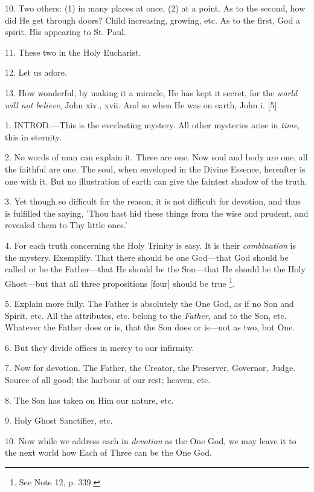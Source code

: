 10. Two others: (1) in many places at once, (2)
at a point. As to the second, how did He get through doors? Child
increasing, growing, etc. As to the first, God a spirit. His appearing
to St. Paul.

11. These two in the Holy Eucharist.

12. Let us adore.

13. How wonderful, by making it a miracle, He has
kept it secret, for the \emph{world will not believe}, John xiv., xvii.
And so when He was on earth, John i. [5].


1. INTROD.—This
is the everlasting mystery. All other mysteries arise in \emph{time},
this in eternity.

2. No words of man can explain it. Three are one.
Now soul and body are one, all the faithful are one. The soul, when
enveloped in the Divine Essence, hereafter is one with it. But no
illustration of earth can give the faintest shadow of the truth.

3. Yet though so difficult for the reason, it is
not difficult for devotion, and thus is fulfilled the saying, 'Thou
hast hid these things from the wise and prudent, and revealed them to
Thy little ones.'

4. For each truth concerning the Holy Trinity is
easy. It is their \emph{combination} is the mystery. Exemplify. That
there should be one God—that God should be called or be the
Father—that He should be the Son—that He should be the Holy
Ghost—but that all three propositions [four] should be true \footnote{See Note
12, p. 339.}.

5. Explain more fully. The Father is absolutely
the One God, as if no Son and Spirit, etc. All the attributes, etc.
belong to the \emph{Father}, and to the Son, etc. Whatever the Father
does or is, that the Son does or is—not as two, but One.

6. But they divide offices in mercy to our
infirmity.

7. Now for devotion. The Father, the Creator, the
Preserver, Governor, Judge. Source of all good; the harbour of our
rest; heaven, etc.

8. The Son has taken on Him our nature, etc.

9. Holy Ghost Sanctifier, etc.

10. Now while we address each in \emph{devotion}
as the One God, we may leave it to the next world how Each of
Three can be the One God.

